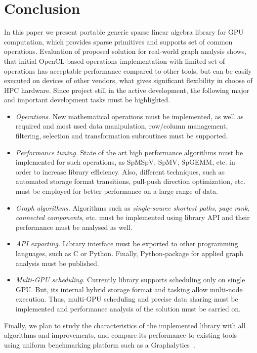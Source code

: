 \section{Conclusion}

In this paper we present portable generic sparse linear algebra library for GPU computation, which provides sparse primitives and supports set of common operations. Evaluation of proposed solution for real-world graph analysis shows, that initial OpenCL-based operations implementation with limited set of operations has acceptable performance compared to other tools, but can be easily executed on devices of other vendors, what gives significant flexibility in choose of HPC hardware. Since project still in the active development, the following major and important development tasks must be highlighted.

\begin{itemize}
    \item \textit{Operations.} New mathematical operations must be implemented, as well as required and most used data manipulation, row/column management, filtering, selection and transformation subroutines must be supported.
    
    \item \textit{Performance tuning.} State of the art high performance algorithms must be implemented for such operations, as SpMSpV, SpMV, SpGEMM, etc. in order to increase library efficiency. Also, different techniques, such as automated storage format transitions, pull-push direction optimization, etc. must be employed for better performance on a large range of data.
    
    \item \textit{Graph algorithms.} Algorithms such as \textit{single-source shortest paths}, \textit{page rank}, \textit{connected components}, etc. must be implemented using library API and their performance must be analysed as well. 
    
    \item \textit{API exporting.} Library interface must be exported to other programming languages, such as C or Python. Finally, Python-package for applied graph analysis must be published.
    
    \item \textit{Multi-GPU scheduling.} Currently library supports scheduling only on single GPU. But, its internal hybrid storage format and tasking allow multi-node execution. Thus, multi-GPU scheduling and precise data sharing must be implemented and performance analysis of the solution must be carried on.
\end{itemize}

Finally, we plan to study the characteristics of the implemented library with all algorithms and improvements, and compare its performance to existing tools using uniform benchmarking platform such as a Graphalytics~\cite{Graphalytics:iosup2021ldbc}.